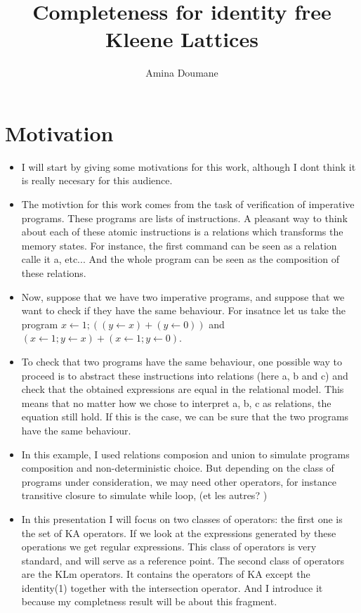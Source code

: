 \documentclass{article}
\title{Completeness for identity free Kleene Lattices }
\author{
  Amina Doumane
}
\begin{document}
\maketitle
\section{Motivation}
\begin{itemize}
\item I will start by giving some motivations for this work, although I dont think it is really necesary for this audience. 
\item  The motivtion for this work comes from the task of verification of imperative programs. These programs are lists of instructions. A pleasant way to think about each of these atomic instructions is a relations which transforms the memory states. For instance, the first command can be seen as a relation calle it a, etc... And the whole program can be seen as the composition of these relations.
\item Now, suppose that we have two imperative programs, and suppose that we want to check if they have the same behaviour. For insatnce let us take the program $x \leftarrow 1; ((y \leftarrow x) + (y \leftarrow 0))$ and
$(x \leftarrow 1; y \leftarrow x) + (x \leftarrow 1; y \leftarrow 0)$.

\item To check that two programs have the same behaviour, one possible way to proceed is to abstract these instructions into relations (here a, b and c) and check that the obtained expressions are equal in the relational model. This means that no matter how we chose to interpret a, b, c as relations, the equation still hold. If this is the case, we can be sure that the two programs have the same behaviour.

\item  In this example, I used relations composion and union to simulate programs composition and non-deterministic choice. But depending on the class of programs under consideration, we may need other operators, for instance transitive closure to simulate while loop, (et les autres? ) 

\item In this presentation I will focus on two classes of operators: the first one is the set of KA operators. If we look at the expressions generated by these operations we get regular expressions. This class of operators is very standard, and will serve as a reference point.
The second class of operators are the KLm operators. It contains the operators of KA except the identity(1) together with the intersection operator. And I introduce it because my completness result will be about this fragment.  


\end{itemize}
\end{document}
